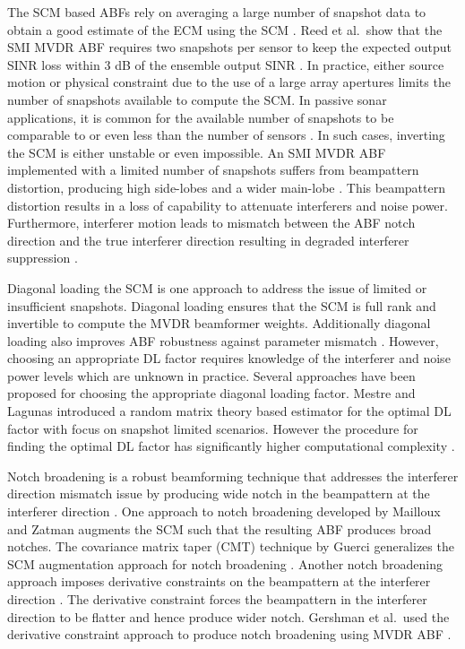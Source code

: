 The SCM based ABFs rely on averaging a large number of snapshot data
to obtain a good estimate of the ECM using the SCM \cite{vtree2002oap,
  reed1974rapid}. Reed et al.\ show that the SMI MVDR ABF requires two
snapshots per sensor to keep the expected output SINR loss within $3$
dB of the ensemble output SINR \cite{reed1974rapid}. In practice,
either source motion or physical constraint due to the use of a large
array apertures limits the number of snapshots available to compute
the SCM. In passive sonar applications, it is common for the available
number of snapshots to be comparable to or even less than the number
of sensors \cite{baggeroer1999passive}. In such cases, inverting the
SCM is either unstable or even impossible. An SMI MVDR ABF implemented
with a limited number of snapshots suffers from beampattern
distortion, producing high side-lobes and a wider main-lobe
\cite{richmond96pdfarray,Carlson1988scm}. This beampattern distortion
results in a loss of capability to attenuate interferers and noise
power. Furthermore, interferer motion leads to mismatch between the
ABF notch direction and the true interferer direction resulting in
degraded interferer suppression \cite{baggeroer1999passive,
  cox2002adaptive, riba1997comm}.

Diagonal loading the SCM is one approach to address the issue of
limited or insufficient snapshots. Diagonal loading ensures that the
SCM is full rank and invertible to compute the MVDR beamformer
weights. Additionally diagonal loading also improves ABF
robustness against parameter mismatch \cite{vtree2002oap,
  mestre2005diagonal}. However, choosing an appropriate DL factor
requires knowledge of the interferer and noise power levels which are
unknown in practice. Several approaches have been proposed for
choosing the appropriate diagonal loading factor. Mestre and Lagunas
introduced a random matrix theory based estimator for the optimal DL
factor with focus on snapshot limited scenarios. However the procedure
for finding the optimal DL factor has significantly higher
computational complexity \cite{mestre2006finite}.

Notch broadening is a robust beamforming technique that addresses the
interferer direction mismatch issue by producing wide notch in the
beampattern at the interferer direction
\cite[Sec.~6.7.6]{vtree2002oap}. One approach to notch broadening
developed by Mailloux \cite{mailloux1995null} and Zatman
\cite{zatman1995null} augments the SCM such that the resulting ABF
produces broad notches. The covariance matrix taper (CMT) technique by
Guerci generalizes the SCM augmentation approach for notch broadening
\cite{guerci1999cmt}. Another notch broadening approach imposes
derivative constraints on the beampattern at the interferer direction
\cite[Sec.~6.7.1.4]{vtree2002oap}. The derivative constraint forces
the beampattern in the interferer direction to be flatter and hence
produce wider notch. Gershman et al.\ used the derivative constraint
approach to produce notch broadening using MVDR ABF
\cite{gershman1991synthesis}.

